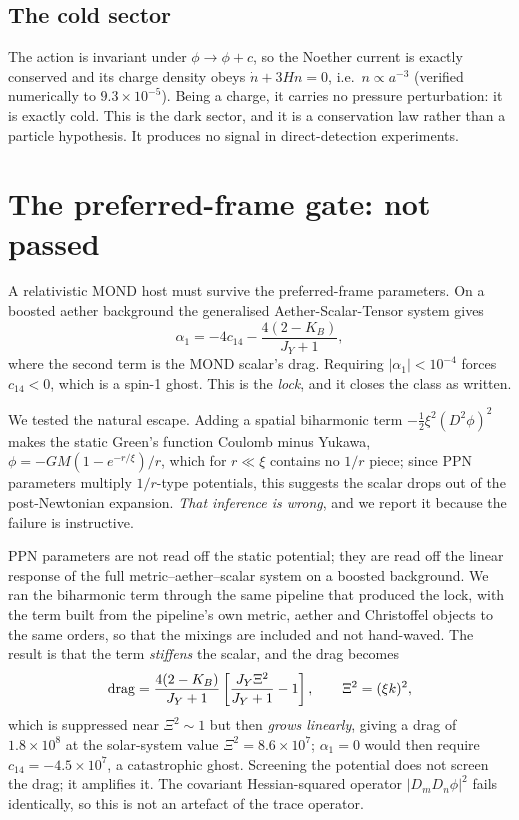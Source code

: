\documentclass[useAMS,usenatbib]{mnras}
\begin{document}
\subsection{The cold sector}

The action is invariant under $\phi\to\phi+c$, so the Noether current is
exactly conserved and its charge density obeys $\dot n+3Hn=0$, i.e.\
$n\propto a^{-3}$ (verified numerically to $9.3\times10^{-5}$).  Being a
charge, it carries no pressure perturbation: it is exactly cold.  This is
the dark sector, and it is a conservation law rather than a particle
hypothesis.  It produces no signal in direct-detection experiments.

\section{The preferred-frame gate: not passed}
\label{sec:ppn}

A relativistic MOND host must survive the preferred-frame parameters.  On a
boosted aether background the generalised Aether-Scalar-Tensor system gives
\citep[our own pipeline,][]{AeSTppn}
\begin{equation}
\alpha_1=-4c_{14}-\frac{4(2-K_B)}{J_Y+1},
\end{equation}
where the second term is the MOND scalar's drag.  Requiring
$|\alpha_1|<10^{-4}$ forces $c_{14}<0$, which is a spin-1 ghost.  This is
the \emph{lock}, and it closes the class as written.

We tested the natural escape.  Adding a spatial biharmonic term
$-\tfrac12\xi^2(D^2\phi)^2$ makes the static Green's function Coulomb minus
Yukawa, $\phi=-GM(1-e^{-r/\xi})/r$, which for $r\ll\xi$ contains no $1/r$
piece; since PPN parameters multiply $1/r$-type potentials, this suggests the
scalar drops out of the post-Newtonian expansion.  \emph{That inference is
wrong}, and we report it because the failure is instructive.

PPN parameters are not read off the static potential; they are read off the
linear response of the full metric--aether--scalar system on a boosted
background.  We ran the biharmonic term through the same pipeline that
produced the lock, with the term built from the pipeline's own metric, aether
and Christoffel objects to the same orders, so that the mixings are included
and not hand-waved.  The result is that the term \emph{stiffens} the scalar,
and the drag becomes
\begin{equation}
{\rm drag}=\frac{4(2-K_B)}{J_Y+1}\left[\frac{J_Y\Xi^2}{J_Y+1}-1\right],
\qquad \Xi^2=(\xi k)^2,
\end{equation}
which is suppressed near $\Xi^2\sim1$ but then \emph{grows linearly}, giving
a drag of $1.8\times10^{8}$ at the solar-system value
$\Xi^2=8.6\times10^{7}$; $\alpha_1=0$ would then require
$c_{14}=-4.5\times10^{7}$, a catastrophic ghost.  Screening the potential
does not screen the drag; it amplifies it.  The covariant Hessian-squared
operator $|D_mD_n\phi|^2$ fails identically, so this is not an artefact of
the trace operator.
\end{document}
